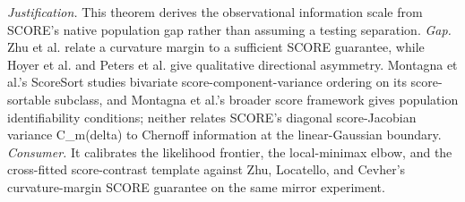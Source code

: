 \documentclass{article}
\begin{document}
\par\smallskip\noindent \textit{Justification.} This theorem derives the observational information scale from SCORE's native population gap rather than assuming a testing separation. \textit{Gap.} Zhu et al. relate a curvature margin to a sufficient SCORE guarantee, while Hoyer et al. and Peters et al. give qualitative directional asymmetry. Montagna et al.'s ScoreSort studies bivariate score-component-variance ordering on its score-sortable subclass, and Montagna et al.'s broader score framework gives population identifiability conditions; neither relates SCORE's diagonal score-Jacobian variance C_m(delta) to Chernoff information at the linear-Gaussian boundary. \textit{Consumer.} It calibrates the likelihood frontier, the local-minimax elbow, and the cross-fitted score-contrast template against Zhu, Locatello, and Cevher's curvature-margin SCORE guarantee on the same mirror experiment.
\end{document}
